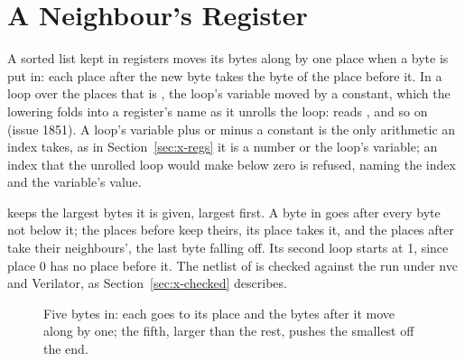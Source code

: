 \section{A Neighbour's Register}
\label{sec:x-sorted}

A sorted list kept in registers moves its bytes along by one place
when a byte is put in: each place after the new byte takes the byte of
the place before it.
In a loop over the places that is , the loop's
variable moved by a constant, which the lowering folds into a register's
name as it unrolls the loop:  reads , and so on
(issue 1851).
A loop's variable plus or minus a constant is the only arithmetic an
index takes, as in Section~\ref{sec:x-regs} it is a number or the
loop's variable; an index that the unrolled loop would make below zero
is refused, naming the index and the variable's value.

 keeps the  largest bytes it is given, largest
first.
A byte in goes after every byte not below it; the places before keep
theirs, its place takes it, and the places after take their
neighbours', the last byte falling off.
Its second loop starts at 1, since place 0 has no place before it.
The netlist of  is checked against the run under nvc
and Verilator, as Section~\ref{sec:x-checked} describes.

\begin{figure}[htbp]
\centering

\caption{Five bytes in: each goes to its place and the bytes after it
move along by one; the fifth, larger than the rest, pushes the
smallest off the end.}
\label{fig:x-sorted}
\end{figure}




